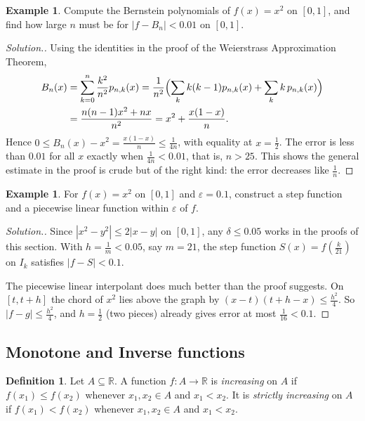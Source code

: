 \documentclass[11pt,a4paper]{article}
\numberwithin{equation}{section}
\theoremstyle{definition}
\newtheorem{defn}[thm]{Definition}
\newtheorem{exa}[thm]{Example}
\newenvironment{solution}
  {\renewcommand{\qedsymbol}{}\begin{proof}[\textit{Solution}.]}
  {\end{proof}}
\begin{document}
\begin{exa}
Compute the Bernstein polynomials of $f(x) = x^2$ on $[0,1]$, and find how large $n$ must be for $|f - B_n|<0.01$ on $[0,1]$.
\end{exa}

\begin{solution}
Using the identities in the proof of the Weierstrass Approximation Theorem,
\begin{align*}
B_n(x) &= \sum_{k=0}^n\frac{k^2}{n^2}p_{n,k}(x) = \frac{1}{n^2}\Bigl(\sum_k k(k-1)p_{n,k}(x) + \sum_k k\,p_{n,k}(x)\Bigr)\\
&= \frac{n(n-1)x^2 + nx}{n^2} = x^2 + \frac{x(1-x)}{n}.
\end{align*}
Hence $0\leq B_n(x) - x^2 = \frac{x(1-x)}{n}\leq\frac{1}{4n}$, with equality at $x = \frac{1}{2}$. The error is less than $0.01$ for all $x$ exactly when $\frac{1}{4n}<0.01$, that is, $n>25$. This shows the general estimate in the proof is crude but of the right kind: the error decreases like $\frac{1}{n}$.
\end{solution}

\begin{exa}
For $f(x) = x^2$ on $[0,1]$ and $\varepsilon = 0.1$, construct a step function and a piecewise linear function within $\varepsilon$ of $f$.
\end{exa}

\begin{solution}
Since $|x^2 - y^2|\leq 2|x-y|$ on $[0,1]$, any $\delta\leq 0.05$ works in the proofs of this section. With $h = \frac{1}{m}<0.05$, say $m = 21$, the step function $S(x) = f\left(\frac{k}{21}\right)$ on $I_k$ satisfies $|f - S|<0.1$.

The piecewise linear interpolant does much better than the proof suggests. On $[t, t+h]$ the chord of $x^2$ lies above the graph by $(x-t)(t+h-x)\leq\frac{h^2}{4}$. So $|f - g|\leq\frac{h^2}{4}$, and $h = \frac{1}{2}$ (two pieces) already gives error at most $\frac{1}{16}<0.1$.
\end{solution}


\subsection{Monotone and Inverse functions}

\begin{defn}
Let $A\subseteq \mathbb{R}$. A function $f: A\longrightarrow \mathbb{R}$ is \emph{increasing} on $A$ if $f(x_1) \leq f(x_2)$ whenever $x_1, x_2\in A$ and $x_1 < x_2$. It is \emph{strictly increasing} on $A$ if $f(x_1)  < f(x_2)$ whenever $x_1, x_2\in A$ and $x_1 < x_2$.
\end{defn}
\end{document}
